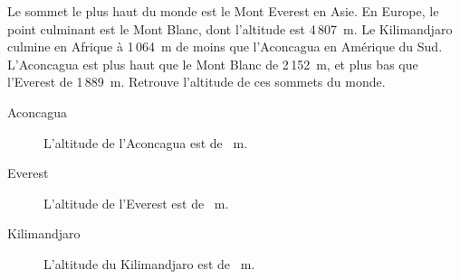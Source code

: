 Le sommet le plus haut du monde est le Mont Everest en Asie. En
Europe, le point culminant est le Mont Blanc, dont l'altitude est
4\,807~m. Le Kilimandjaro culmine en Afrique à 1\,064~m de moins
que l'Aconcagua en Amérique du Sud. L'Aconcagua est plus haut que le
Mont Blanc de 2\,152~m, et plus bas que l'Everest de
1\,889~m. Retrouve l'altitude de ces sommets du monde.
\begin{multicols}{3}
\begin{description}
\item[Aconcagua]\subitem{}\par
{}\par L'altitude de l'Aconcagua est de ~m.
\item[Everest]\subitem{}\par
{}\par L'altitude de l'Everest est de ~m.
\item[Kilimandjaro]\subitem{}\par
{}\par L'altitude du Kilimandjaro est de ~m.
\end{description}
\end{multicols}